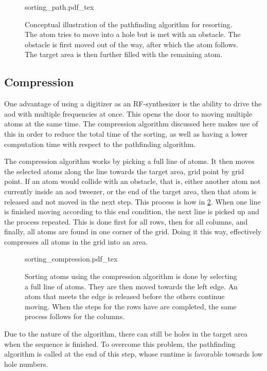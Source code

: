 \begin{figure}[ht]
\label{fig:sorting_path}
\centering
	{sorting_path.pdf_tex}
	\caption{Conceptual illustration of the pathfinding algorithm for resorting. The atom tries to move into a hole but is met with an obstacle. The obstacle is first moved out of the way, after which the atom follows. The target area is then further filled with the remaining atom.}
\end{figure}

\subsection{Compression}
\label{sec:compression}

One advantage of using a digitizer as an RF-synthesizer is the ability to drive the \ac{aod} with multiple frequencies at once. This opens the door to moving multiple atoms at the same time. The compression algorithm discussed here makes use of this in order to reduce the total time of the sorting, as well as having a lower computation time with respect to the pathfinding algorithm.

The compression algorithm works by picking a full line of atoms. It then moves the selected atoms along the line towards the target area, grid point by grid point. If an atom would collide with an obstacle, that is, either another atom not currently inside an \ac{aod} tweezer, or the end of the target area, then that atom is released and not moved in the next step. This process is how in \ref{fig:sorting_compression}. When one line is finished moving according to this end condition, the next line is picked up and the process repeated. This is done first for all rows, then for all columns, and finally, all atoms are found in one corner of the grid. Doing it this way, effectively compresses all atoms in the grid into an area.

\begin{figure}[ht]
\label{fig:sorting_compression}
\centering
	{sorting_compression.pdf_tex}
	\caption{Sorting atoms using the compression algorithm is done by selecting a full line of atoms. They are then moved towards the left edge. An atom that meets the edge is released before the others continue moving. When the steps for the rows have are completed, the same process follows for the columns.}
\end{figure}

Due to the nature of the algorithm, there can still be holes in the target area when the sequence is finished. To overcome this problem, the pathfinding algorithm is called at the end of this step, whose runtime is favorable towards low hole numbers.

